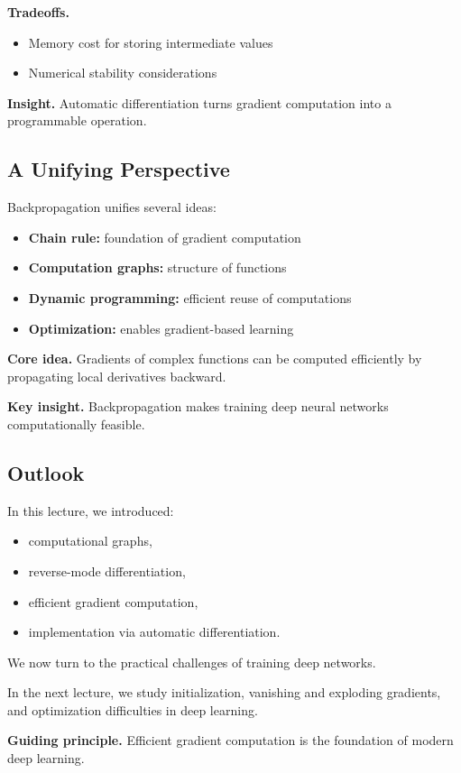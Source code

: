 \medskip

\noindent
\textbf{Tradeoffs.}

\begin{itemize}
    \item Memory cost for storing intermediate values
    \item Numerical stability considerations
\end{itemize}

\medskip

\noindent
\textbf{Insight.}  
Automatic differentiation turns gradient computation into a programmable operation.

\subsection{A Unifying Perspective}

Backpropagation unifies several ideas:

\begin{itemize}
    \item \textbf{Chain rule:} foundation of gradient computation
    \item \textbf{Computation graphs:} structure of functions
    \item \textbf{Dynamic programming:} efficient reuse of computations
    \item \textbf{Optimization:} enables gradient-based learning
\end{itemize}

\medskip

\noindent
\textbf{Core idea.}  
Gradients of complex functions can be computed efficiently by propagating local derivatives backward.

\medskip

\noindent
\textbf{Key insight.}  
Backpropagation makes training deep neural networks computationally feasible.

\subsection{Outlook}

In this lecture, we introduced:

\begin{itemize}
    \item computational graphs,
    \item reverse-mode differentiation,
    \item efficient gradient computation,
    \item implementation via automatic differentiation.
\end{itemize}

\medskip

\noindent
We now turn to the practical challenges of training deep networks.

\medskip

\noindent
In the next lecture, we study initialization, vanishing and exploding gradients, and optimization difficulties in deep learning.

\medskip

\noindent
\textbf{Guiding principle.}  
Efficient gradient computation is the foundation of modern deep learning.